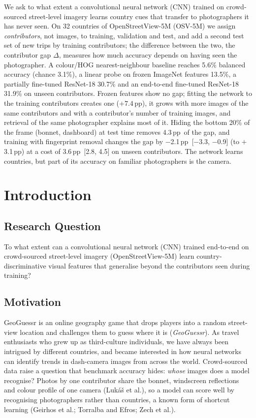 \documentclass[clean,twocolumn]{bam-project}
\newcommand{\pp}{\,pp}
\begin{document}
\makebamtitle

\begin{BAMabstract}
We ask to what extent a convolutional neural network (CNN) trained on crowd-sourced street-level
imagery learns country cues that transfer to photographers it has never seen. On 32 countries of
OpenStreetView-5M (OSV-5M) we assign \emph{contributors}, not images, to training, validation and test,
and add a second test set of new trips by training contributors; the difference between the two, the
contributor gap $\Delta$, measures how much accuracy depends on having seen the photographer. A
colour/HOG nearest-neighbour baseline reaches 5.6\% balanced accuracy (chance 3.1\%), a linear probe on
frozen ImageNet features 13.5\%, a partially fine-tuned ResNet-18 30.7\% and an end-to-end fine-tuned ResNet-18 31.9\% on unseen contributors. Frozen
features show no gap; fitting the network to the training contributors creates one ($+7.4$\pp), it
grows with more images of the same contributors and with a contributor's number of training images, and
retrieval of the same photographer explains most of it. Hiding the bottom 20\% of the frame (bonnet,
dashboard) at test time removes 4.3\pp\ of the gap, and training with fingerprint removal changes the gap by $-$2.1\pp\ [$-$3.3, $-$0.9] (to $+$3.1\pp) at a cost of 3.6\pp\ [2.8, 4.5] on unseen contributors. The network learns countries, but part of its accuracy on familiar
photographers is the camera.
\end{BAMabstract}

\section{Introduction}
\subsection{Research Question}
To what extent can a convolutional neural network (CNN) trained end-to-end on crowd-sourced
street-level imagery (OpenStreetView-5M) learn country-discriminative visual features that generalise
beyond the contributors seen during training?

\subsection{Motivation}
GeoGuessr is an online geography game that drops players into a random street-view location and
challenges them to guess where it is (\emph{GeoGuessr}). As travel enthusiasts who grew up as
third-culture individuals, we have always been intrigued by different countries, and became interested in
how neural networks can identify trends in dash-camera images from across the world. Crowd-sourced data
raise a question that benchmark accuracy hides: \emph{whose} images does a model recognise? Photos by
one contributor share the bonnet, windscreen reflections and colour profile of one camera (Luk\'a\v{s}
et al.), so a model can score well by recognising photographers rather than countries, a known form of
shortcut learning (Geirhos et al.; Torralba and Efros; Zech et al.).
\end{document}
